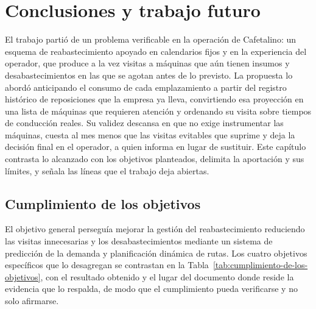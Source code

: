 \section{Conclusiones y trabajo futuro}\label{conclusiones-y-trabajo-futuro}

El trabajo partió de un problema verificable en la operación de Cafetalino: un esquema de reabastecimiento apoyado en calendarios fijos y en la experiencia del operador, que produce a la vez visitas a máquinas que aún tienen insumos y desabastecimientos en las que se agotan antes de lo previsto. La propuesta lo abordó anticipando el consumo de cada emplazamiento a partir del registro histórico de reposiciones que la empresa ya lleva, convirtiendo esa proyección en una lista de máquinas que requieren atención y ordenando su visita sobre tiempos de conducción reales. Su validez descansa en que no exige instrumentar las máquinas, cuesta al mes menos que las visitas evitables que suprime y deja la decisión final en el operador, a quien informa en lugar de sustituir. Este capítulo contrasta lo alcanzado con los objetivos planteados, delimita la aportación y sus límites, y señala las líneas que el trabajo deja abiertas.

\subsection{Cumplimiento de los objetivos}\label{cumplimiento-de-los-objetivos}

El objetivo general perseguía mejorar la gestión del reabastecimiento reduciendo las visitas innecesarias y los desabastecimientos mediante un sistema de predicción de la demanda y planificación dinámica de rutas. Los cuatro objetivos específicos que lo desagregan se contrastan en la Tabla~\ref{tab:cumplimiento-de-los-objetivos}, con el resultado obtenido y el lugar del documento donde reside la evidencia que lo respalda, de modo que el cumplimiento pueda verificarse y no solo afirmarse.

\label{tab:cumplimiento-de-los-objetivos}

